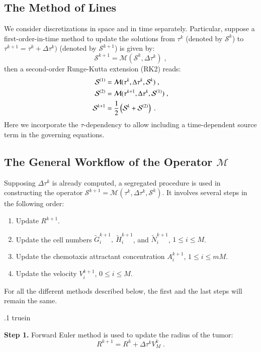 \documentclass{amsart}
\theoremstyle{definition}
\theoremstyle{remark}
\numberwithin{equation}{section}
\numberwithin{figure}{section}
\begin{document}
\subsection{The Method of Lines}
We consider discretizations in space and in time separately.
Particular, suppose a first-order-in-time method to update the solutions from $\tau^k$ (denoted by $\mathcal{S}^k$) to $\tau^{k+1}=\tau^k+\Delta\tau^k)$ (denoted by $\mathcal{S}^{k+1}$) is given by: 
\begin{displaymath}
\mathcal{S}^{k+1} = \mathcal{M}(\mathcal{S}^k,\Delta\tau^k)\;,
\end{displaymath}
then a second-order Runge-Kutta extension (RK2) reads:
\begin{align}
\notag
\mathcal{S}^{(1)} &= \mathcal{M}(\tau^k, \Delta \tau^k,\mathcal{S}^k)\;, \\ 
\label{eq:num_rk2}
\mathcal{S}^{(2)} &= \mathcal{M}(\tau^{k+1}, \Delta \tau^k,\mathcal{S}^{(1)})\;, \\
\notag
\mathcal{S}^{k+1} &= \frac{1}{2}\left(\mathcal{S}^k + \mathcal{S}^{(2)}\right)\;.
\end{align}
Here we incorporate the $\tau$-dependency to allow including a time-dependent source term in the governing equations.

\subsection{The General Workflow of the Operator \texorpdfstring{$\mathcal{M}$}{M}}
Supposing $\Delta\tau^k$ is already computed, a segregated procedure is used in constructing the operator $\mathcal{S}^{k+1} = \mathcal{M}(\tau^k, \Delta\tau^k, \mathcal{S}^k)$.
It involves several steps in the following order:
\begin{enumerate}
\item Update $R^{k+1}$.
\item Update the cell numbers $\tilde{G}_i^{k+1},\ \tilde{H}_i^{k+1}$, and $\tilde{N}_i^{k+1}$, $1\le i\le M$.
\item Update the chemotaxis attractant concentration $A_i^{k+1}$, $1\le i\le mM$.
\item Update the velocity $V_i^{k+1}$, $0\le i\le M$.
\end{enumerate}
For all the different methods described below, the first and the last steps will remain the same.

\vglue .1 truein

\noindent
{\bf Step 1.} Forward Euler method is used to update the radius of the tumor:
\begin{equation}\label{eq:num_gen_r}
R^{k+1} = R^k + \Delta\tau^kV_M^k\;.
\end{equation}
\end{document}

